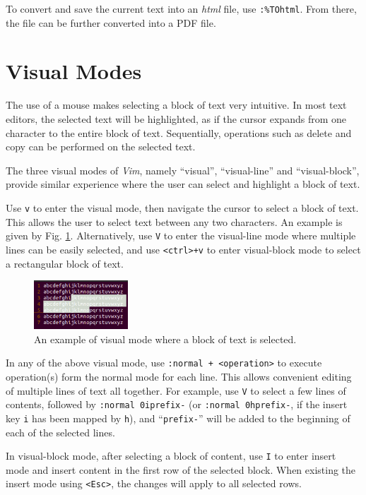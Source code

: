 To convert and save the current text into an \textit{html} file, use \verb|:%TOhtml|. From there, the file can be further converted into a PDF file.

\section{Visual Modes}

The use of a mouse makes selecting a block of text very intuitive. In most text editors, the selected text will be highlighted, as if the cursor expands from one character to the entire block of text. Sequentially, operations such as delete and copy can be performed on the selected text.

The three visual modes of \textit{Vim}, namely ``visual'', ``visual-line'' and ``visual-block'', provide similar experience where the user can select and highlight a block of text.

Use \verb|v| to enter the visual mode, then navigate the cursor to select a block of text. This allows the user to select text between any two characters. An example is given by Fig. \ref{ch:tfe:fig:vimvm1}. Alternatively, use \verb|V| to enter the visual-line mode where multiple lines can be easily selected, and use \verb|<ctrl>+v| to enter visual-block mode to select a rectangular block of text.

\begin{figure}[htbp]
	\centering
	\includegraphics[width=100pt]{chapters/ch-text-file-editing/figures/vimvm1.png}
	\caption{An example of visual mode where a block of text is selected.} \label{ch:tfe:fig:vimvm1}
\end{figure}

In any of the above visual mode, use \verb|:normal + <operation>| to execute operation(s) form the normal mode for each line. This allows convenient editing of multiple lines of text all together. For example, use \verb|V| to select a few lines of contents, followed by \verb|:normal 0iprefix-| (or \verb|:normal 0hprefix-|, if the insert key \verb|i| has been mapped by \verb|h|), and ``\verb|prefix-|'' will be added to the beginning of each of the selected lines.

In visual-block mode, after selecting a block of content, use \verb|I| to enter insert mode and insert content in the first row of the selected block. When existing the insert mode using \verb|<Esc>|, the changes will apply to all selected rows.

